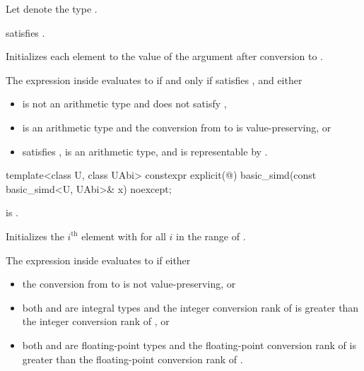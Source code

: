 \begin{itemdescr}
\pnum
Let  denote the type .

\pnum
\constraints
{} satisfies .

\pnum
\effects
Initializes each element to the value of the argument after conversion to
.

\pnum
\remarks
The expression inside  evaluates to  if and only if
 satisfies , and either
\begin{itemize}
 \item
    is not an arithmetic type and does not satisfy
   ,
 \item
    is an arithmetic type and the conversion from  to
    is value-preserving, or
 \item
    satisfies ,
    is an arithmetic type, and
    is representable by .
\end{itemize}
\end{itemdescr}

\begin{itemdecl}
template<class U, class UAbi>
  constexpr explicit(@\seebelow@) basic_simd(const basic_simd<U, UAbi>& x) noexcept;
\end{itemdecl}

\begin{itemdescr}
\pnum
\constraints
{} is .

\pnum
\effects
Initializes the $i^\text{th}$ element with  for
all $i$ in the range of .

\pnum
\remarks
The expression inside  evaluates to  if either
\begin{itemize}
 \item
   the conversion from  to  is not value-preserving,
   or
 \item
   both  and  are integral types and the integer
   conversion rank of  is greater than the integer
   conversion rank of , or
 \item
   both  and  are floating-point types and the
   floating-point conversion rank of  is greater than
   the floating-point conversion rank of .
\end{itemize}
\end{itemdescr}

